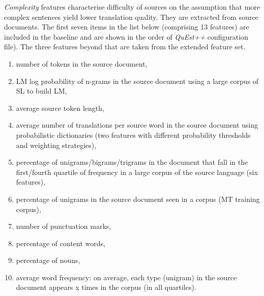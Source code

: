 \textit{Complexity} features characterise difficulty of sources on the assumption that more complex sentences yield lower translation quality. They are extracted from source documents. The first seven items in the list below (comprising 13 features) are included in the baseline and are shown in the order of \textit{QuEst++} configuration file). The three features beyond that are taken from the extended feature set.  
\begin{enumerate}\compresslist{}
	\item number of tokens in the source document,
	\item LM log probability of n-grams in the source document using a large corpus of SL to build LM,
	\item average source token length,
	\item average number of translations per source word in the source document using probabilistic dictionaries  (two features with different probability thresholds and weighting strategies),
	\item percentage of unigrams/bigrams/trigrams in the document that fall in the first/fourth quartile of frequency in a large corpus of the source language (six features),
	\item percentage of unigrams in the source document seen in a corpus (MT training corpus),
	\item number of punctuation marks,
	\item percentage of content words,
	\item percentage of nouns,
	\item average word frequency: on average, each type (unigram) in the source document appears x times in the corpus (in all quartiles).
\end{enumerate}

